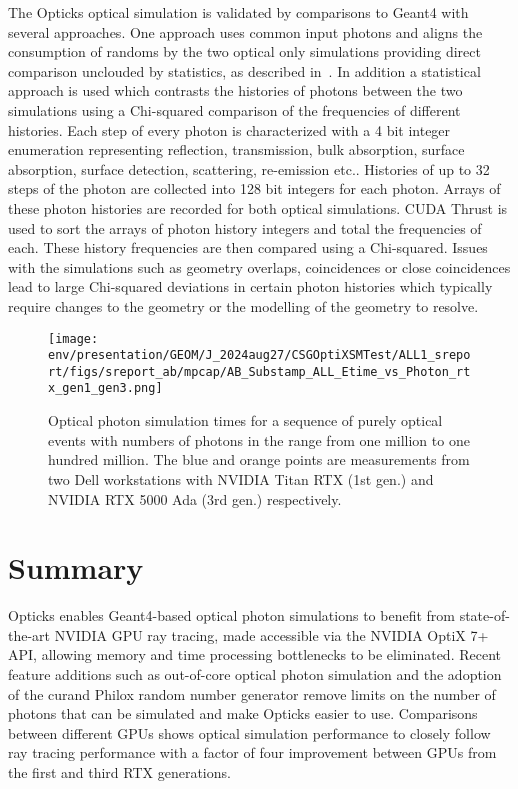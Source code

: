 \documentclass{webofc}
\begin{document}
The Opticks optical simulation is validated by comparisons to Geant4 with several approaches.
One approach uses common input photons and aligns the consumption of randoms by the two optical only simulations 
providing direct comparison unclouded by statistics, as described in~\cite{chep2018}.   
In addition a statistical approach is used which contrasts the histories of photons between the 
two simulations using a Chi-squared comparison of the frequencies of different histories. 
Each step of every photon is characterized with a 4 bit integer enumeration representing reflection, 
transmission, bulk absorption, surface absorption, surface detection, scattering, re-emission etc..
Histories of up to 32 steps of the photon are collected into 128 bit integers for each photon.
Arrays of these photon histories are recorded for both optical simulations. CUDA Thrust is
used to sort the arrays of photon history integers and total the frequencies of each.  
These history frequencies are then compared using a Chi-squared. Issues with the 
simulations such as geometry overlaps, coincidences or close coincidences lead to
large Chi-squared deviations in certain photon histories which typically require
changes to the geometry or the modelling of the geometry to resolve.   
%
\begin{figure}
\centering
\texttt{[image: env/presentation/GEOM/J\_2024aug27/CSGOptiXSMTest/ALL1\_sreport/figs/sreport\_ab/mpcap/AB\_Substamp\_ALL\_Etime\_vs\_Photon\_rtx\_gen1\_gen3.png]}
\caption{%
Optical photon simulation times for a sequence of purely optical events with numbers of photons 
in the range from one million to one hundred million. The blue and orange points are measurements from 
two Dell workstations with NVIDIA Titan RTX (1st gen.) and NVIDIA RTX 5000 Ada (3rd gen.) respectively.
}
\label{rtxgenscan}
\vspace{-5mm}
\end{figure}%
%
%     
%
%
%
\section{Summary}
%
Opticks enables Geant4-based optical photon simulations to benefit from 
state-of-the-art NVIDIA GPU ray tracing, made accessible via the NVIDIA OptiX 7+ API,
allowing memory and time processing bottlenecks to be eliminated. 
Recent feature additions such as out-of-core optical photon simulation and the 
adoption of the curand Philox random number generator remove limits on the number of 
photons that can be simulated and make Opticks easier to use. 
Comparisons between different GPUs shows optical simulation performance 
to closely follow ray tracing performance with a factor of four improvement between 
GPUs from the first and third RTX generations. 
%
%
\end{document}
